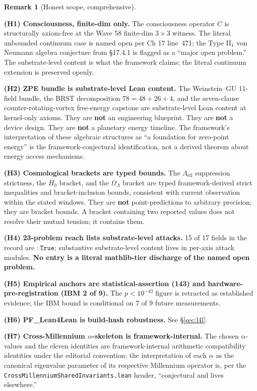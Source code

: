 \documentclass[11pt,a4paper]{article}
\theoremstyle{plain}
\theoremstyle{definition}
\newtheorem{remark}[theorem]{Remark}
\begin{document}
\begin{remark}[Honest scope, comprehensive]
\label{rem:honest-scope-phase4}

\textbf{(H1) Consciousness, finite-dim only.} The consciousness
operator $C$ is structurally axiom-free at the Wave 58 finite-dim
$3 \times 3$ witness. The literal unbounded continuum case is named
open per Ch 17 line~471; the Type II$_{1}$ von Neumann algebra
conjecture from \S17.4.1 is flagged as a ``major open problem.'' The
substrate-level content is what the framework claims; the literal
continuum extension is preserved openly.

\textbf{(H2) ZPE bundle is substrate-level Lean content.} The
Weinstein--GU 11-field bundle, the BRST decomposition
$78 = 48 + 26 + 4$, and the seven-clause counter-rotating-vortex
free-energy capstone are substrate-level Lean content at kernel-only
axioms. They are \textbf{not} an engineering blueprint. They are
\textbf{not} a device design. They are \textbf{not} a planetary
energy timeline. The framework's interpretation of these algebraic
structures as ``a foundation for zero-point energy'' is the
framework-conjectural identification, not a derived theorem about
energy access mechanisms.

\textbf{(H3) Cosmological brackets are typed bounds.} The
$\Lambda_{\mathrm{eff}}$ suppression strictness, the $H_{0}$ bracket,
and the $\Omega_{\Lambda}$ bracket are typed framework-derived strict
inequalities and bracket-inclusion bounds, consistent with current
observation within the stated windows. They are \textbf{not}
point-predictions to arbitrary precision; they are bracket bounds. A
bracket containing two reported values does not resolve their
mutual tension; it contains them.

\textbf{(H4) 23-problem reach lists substrate-level attacks.} 15 of
17 fields in the record are $\mathtt{: True}$; substantive
substrate-level content lives in per-axis attack modules. \textbf{No
entry is a literal mathlib-tier discharge of the named open
problem.}

\textbf{(H5) Empirical anchors are statistical-assertion (143) and
hardware-pre-registration (IBM 2 of 9).} The $p < 10^{-43}$ figure
is retracted as established evidence; the IBM bound is conditional
on 7 of 9 future measurements.

\textbf{(H6) PF\_Lean4Lean is build-hash robustness.} See \S\ref{sec:l4l}.

\textbf{(H7) Cross-Millennium $\alpha$-skeleton is framework-internal.}
The chosen $\alpha$-values and the eleven identities are framework-internal
arithmetic compatibility identities under the editorial convention;
the interpretation of each $\alpha$ as the canonical eigenvalue
parameter of its respective Millennium operator is, per the
\texttt{CrossMillenniumSharedInvariants.lean} header, ``conjectural
and lives elsewhere.''
\end{remark}
\end{document}

